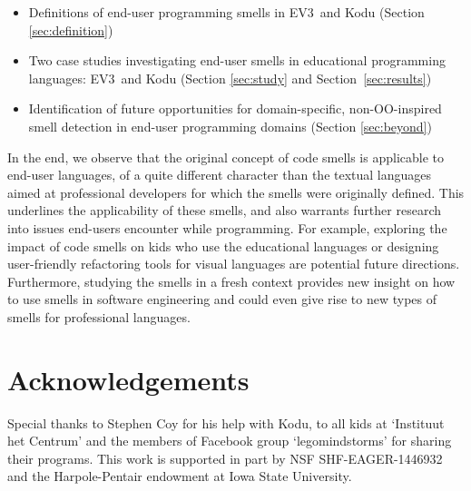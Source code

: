 \documentclass[conference]{IEEEtran}
\begin{document}
\begin{itemize} \itemsep -0.25pt
	\item Definitions of end-user programming smells in EV3~and Kodu  (Section \ref{sec:definition})
	\item Two case studies investigating end-user smells in educational programming languages: EV3~and Kodu   (Section \ref{sec:study} and Section~\ref{sec:results})
	\item Identification of future opportunities for domain-specific, non-OO-inspired smell detection in end-user programming domains (Section \ref {sec:beyond})
\end{itemize}

In the end, we observe that the original concept of code smells is applicable to end-user languages, of a quite different character than the textual languages aimed at professional developers for which the smells were originally defined. This underlines the applicability of these smells, and also warrants further research into issues end-users encounter while programming. For example, exploring the impact of code smells on kids who use the educational languages or designing user-friendly refactoring tools for visual languages are potential future directions. 
Furthermore, studying the smells in a fresh context provides new insight on how to use smells in software engineering and could even give rise to new types of smells for professional languages. 

\balance

\section*{Acknowledgements}
Special thanks to Stephen Coy for his help with Kodu, to all kids at `Instituut het Centrum' and the members of Facebook group `legomindstorms' for sharing their programs. This work is supported in part by  NSF SHF-EAGER-1446932 and the Harpole-Pentair endowment at Iowa State University.




\end{document}
